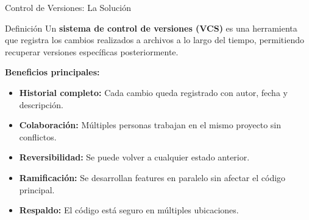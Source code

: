 \documentclass[aspectratio=169]{beamer}
\begin{document}
\begin{frame}{Control de Versiones: La Solución}
    \begin{block}{Definición}
        Un \textbf{sistema de control de versiones (VCS)} es una herramienta que registra los cambios realizados a archivos a lo largo del tiempo, permitiendo recuperar versiones específicas posteriormente.
    \end{block}
    \vspace{0.3cm}
    
    \textbf{Beneficios principales:}
    \begin{itemize}
        \item \textbf{Historial completo:} Cada cambio queda registrado con autor, fecha y descripción.
        \item \textbf{Colaboración:} Múltiples personas trabajan en el mismo proyecto sin conflictos.
        \item \textbf{Reversibilidad:} Se puede volver a cualquier estado anterior.
        \item \textbf{Ramificación:} Se desarrollan features en paralelo sin afectar el código principal.
        \item \textbf{Respaldo:} El código está seguro en múltiples ubicaciones.
    \end{itemize}
\end{frame}
\end{document}
